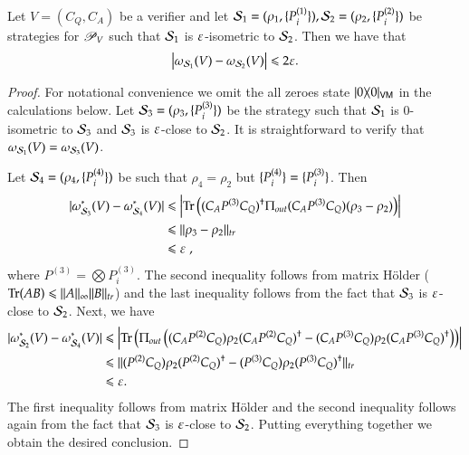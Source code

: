 \begin{lemma}
\label{lem:close_strategies}
	Let $V = (C_Q,C_A)$ be a verifier and let $\mathcal{S}_1 = (\rho_1,\{P^{(1)}_i\}),\mathcal{S}_2= (\rho_2,\{P^{(2)}_i\})$ be strategies for $\mathscr{P}_V$ such that $\mathcal{S}_1$ is $\varepsilon$-isometric to $\mathcal{S}_2$. Then we have that
	\[
		\left\lvert \omega_{\mathcal{S}_1}(V) - \omega_{\mathcal{S}_2}(V) \right\rvert \leqslant 2\varepsilon.
	\]
\end{lemma}
\begin{proof}
For notational convenience we omit the all zeroes state $|0\rangle\! \langle 0|_{{\mathsf{V}} {\mathsf{M}}}$ in the calculations below. Let $\mathcal{S}_3= (\rho_3,\{P^{(3)}_i\})$ be the strategy such that $\mathcal{S}_1$ is $0$-isometric to $\mathcal{S}_3$ and $\mathcal{S}_3$ is $\varepsilon$-close to $\mathcal{S}_2$. It is straightforward to verify that $\omega_{\mathcal{S}_1}(V) = \omega_{\mathcal{S}_3}(V)$. 
	
	Let $\mathcal{S}_4 = (\rho_4,\{ P^{(4)}_i\})$ be such that $\rho_4 = \rho_2$ but $\{P^{(4)}_i\} = \{P^{(3)}_i\}$. Then
	\begin{align*}
		\lvert \omega^*_{\mathcal{S}_3}(V) - \omega^*_{\mathcal{S}_4}(V)\rvert &\leqslant \left\lvert \operatorname{Tr}\left( (C_A P^{(3)} C_Q)^\dagger \Pi_{out} (C_A P^{(3)} C_Q) (\rho_3 - \rho_2)\right) \right\rvert \\
		&\leqslant \lVert \rho_3 - \rho_2\rVert_{tr} \\
		&\leqslant \varepsilon\;,
	\end{align*}
	where $P^{(3)} = \bigotimes P^{(3)}_i$. The second inequality follows from matrix H\"{o}lder ($\operatorname{Tr}(AB) \leqslant \|A\|_\infty \|B\|_{tr}$) and the last inequality follows from the fact that $\mathcal{S}_3$ is $\varepsilon$-close to $\mathcal{S}_2$.
	Next, we have
	\begin{align*}
		\lvert \omega^*_{\mathcal{S}_2}(V) - \omega^*_{\mathcal{S}_4}(V)\rvert &\leqslant \left\lvert \operatorname{Tr}\left( \Pi_{out} \left( (C_A P^{(2)} C_Q)\rho_2 (C_A P^{(2)} C_Q)^\dagger  - (C_A P^{(3)} C_Q) \rho_2 (C_A P^{(3)} C_Q)^\dagger  \right) \right)\right\rvert \\
		&\leqslant \lVert (P^{(2)} C_Q) \rho_2 (P^{(2)} C_Q)^\dagger - (P^{(3)} C_Q) \rho_2 (P^{(3)} C_Q)^\dagger\rVert_{tr} \\
		&\leqslant \varepsilon.
	\end{align*}	
	The first inequality follows from matrix H\"{o}lder and the second inequality follows again from the fact that $\mathcal{S}_3$ is $\varepsilon$-close to $\mathcal{S}_2$. Putting everything together we obtain the desired conclusion.

\end{proof}










